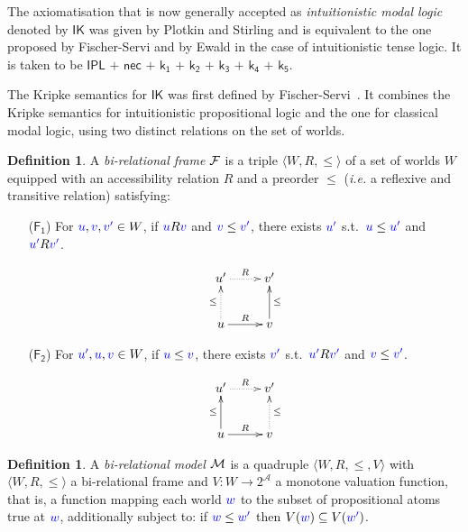 \documentclass[a4paper]{article}
\theoremstyle{plain}
\theoremstyle{definition}
\newtheorem{definition}[theorem]{Definition}
\newcommand*{\ax}[1]{\mathsf{#1}}
\newcommand*{\kax}[1][]		{\ax{k_{#1}}}
\newcommand*{\IK}{\mathsf{IK}}
\newcommand*{\lb}[1]{{\color{blue}{#1}}}
\newcommand*{\accs}[2]{\lb{#1}R\lb{#2}}
\newcommand*{\futs}[2]{\lb{#1}\le{\color{blue}{#2}}}
\newcommand*{\rn}[1]  {\ensuremath{\mathsf{#1}}}
\newcommand*{\rel}{R}
\begin{document}
The axiomatisation that is now generally accepted as \emph{intuitionistic modal logic} denoted by $\IK$ was given by Plotkin and Stirling \cite{Plotkin} and is equivalent to the one proposed by Fischer-Servi \cite{Fischer} and by Ewald \cite{Ewald} in the case of intuitionistic tense logic. It is taken to be    $\rn{IPL}$ $\rn{+}$ $\rn{nec}$ $\rn{+}$ $\kax[1]$ $\rn{+}$ $\kax[2]$ $\rn{+}$ $\kax[3]$ $\rn{+}$ $\kax[4]$  $\rn{+}$ $\kax[5]$.


The Kripke semantics for $\IK$ was first defined by Fischer-Servi~\cite{Fischer}.
%
It combines the Kripke semantics for intuitionistic propositional logic and the one for classical modal logic, using two distinct relations on the set of worlds.

\begin{definition}
	A \emph{bi-relational frame} $\mathcal{F}$ is a triple $\langle W, \rel, \le \rangle$ 
	of a set of worlds $W$ equipped with an {accessibility relation} $\rel$ and a preorder $\le$ (\emph{i.e.} a reflexive and transitive relation) satisfying:
	\begin{enumerate}
		\item[($\rn{F_1}$)] For $\lb u, \lb v, \lb{v'} \in W$, if $\accs uv$ and $\futs v{v'}$, there exists $\lb{u'}$ s.t.~$\futs u{u'}$ and $\accs{u'}{v'}$.
		
		\begin{equation*}
		\xymatrix{
			u' \ar@{.>}[r]^R  & v' \\
			u \ar@{.>}[u]^{\le} \ar@{->}[r]^R  & v \ar@{->}[u]_{\le}
		}
		\end{equation*}
		
		\item[($\rn{F_2}$)] For $\lb {u'}, \lb u, \lb v \in W$, if $\futs uv$, there exists $\lb {v'}$ s.t.~$\accs{u'}{v'}$ and $\futs v{v'}$.
		
		\begin{equation*}
		\xymatrix{
			u' \ar@{.>}[r]^R & v' \\
			u \ar@{->}[u]^{\le} \ar@{->}[r]^R & v \ar@{.>}[u]_{\le}
		}
		\end{equation*}
	\end{enumerate}
\end{definition}

\begin{definition}
	\label{model}
	A \emph{bi-relational model} $\mathcal{M}$ is a quadruple $\langle W, \rel,\le,V \rangle$ with $\langle W, \rel, \le \rangle$ a bi-relational frame and $V\colon W \to 2^\mathcal{A}$ a monotone valuation function, that is, a function mapping each world $\lb w$ to the subset of propositional atoms true at $\lb w$, additionally subject to:
	if $\lb w \le \lb{w'}$ then $V(\lb w)\subseteq V(\lb{w'})$.
\end{definition}
\end{document}
